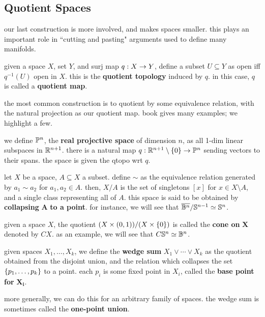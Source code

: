 \subsection{Quotient Spaces}
our last construction is more involved, and makes spaces smaller. this plays an
important role in ``cutting and pasting" arguments used to define many manifolds.

\begin{defn}
    given a space $ X $, set $ Y $, and surj map $ q:X\rightarrow Y $, define a subset
    $ U \subseteq Y $ as open iff $ q^{-1}(U) $ open in $ X $. this is the
    \textbf{quotient topology} induced by $ q $. in this case, $ q $ is called a
    \textbf{quotient map}.
\end{defn}

the most common construction is to quotient by some equivalence relation, with
the natural projection as our quotient map. book gives many examples; we
highlight a few.

\begin{xmp}[source=Primary Source Material]
    we define $\mathbb{P}^{n}$, the \textbf{real projective space} of dimension $n$,
    as all 1-dim linear subspaces in $\mathbb{R}^{n+1}$. there is a natural map
    $q:\mathbb{R}^{n+1}\setminus\left\{{0}\right\}\rightarrow\mathbb{P}^{n}$ sending vectors to their spans.
    the space is given the qtopo wrt $q$.
\end{xmp}

\newpage
\begin{xmp}[source=Primary Source Material]
    let $ X $ be a space, $ A \subseteq X $ a subset. define $ \sim $ as the
    equivalence relation generated by $ a_{1} \sim a_{2} $ for $ a_{1},a_{2} \in
    A $. then, $ X/A $ is the set of singletons $ [x] $ for
    $ x \in X\setminus A $, and a single class representing all of $ A $. this
    space is said to be obtained by \textbf{collapsing} $ \bm{A} $ \textbf{to a
    point}. for instance, we will see that $ \overline{\mathbb{B}^{n}}/\mathbb{S}^{n-1} \simeq
    \mathbb{S}^{n} $.
\end{xmp}

\begin{xmp}[source=Primary Source Material]
    given a space $ X $, the quotient $ (X\times (0,1))/(X \times \left\{{0}\right\}) $ is
    called the \textbf{cone on} $ \bm{X} $ denoted by $ CX $. as an example, we
    will see that $ C\mathbb{S}^{n} \simeq \mathbb{B}^{n} $.
\end{xmp}

\begin{xmp}[source=Primary Source Material]
    given spaces $ X_{1}, \dots, X_{k} $, we define the \textbf{wedge sum} 
    $ X_{1} \vee \cdots \vee X_{k} $ as the quotient obtained from the disjoint
    union, and the relation which collapses the set $ \left\{{p_{1},\dots,p_{k}}\right\} $
    to a point. each $ p_{i} $ is some fixed point in $ X_{i} $, called the
    \textbf{base point for} $ \bm{X_{i}} $.

    more generally, we can do this for an arbitrary family of spaces. the wedge
    sum is sometimes called the \textbf{one-point union}.
\end{xmp}

